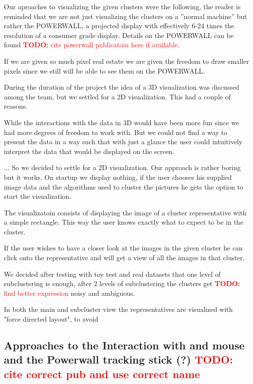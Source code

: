 \documentclass[journal]{vgtc}       %
\newcommand{\todo}[1]{\textcolor{red}{\textbf{TODO:} #1}}
\begin{document}
Our aproaches to visualizing the given clusters were the following, the reader is reminded that we are not just visualizing the clusters on a ''normal machine'' but rather the POWERWALL, a projected display with effectively 6-24 times the resolution of a consumer grade display. Details on the POWERWALL can be found \todo{cite powerwall publicatoin here if available}. \cite{powerwall}

If we are given so much pixel real estate we are given the freedom to draw smaller pixels since we still will be able to see them on the POWERWALL.

During the duration of the project the idea of a 3D visualization was discussed among the team, but we settled for a 2D visualization. This had a couple of reasons.

While the interactions with the data in 3D would have been more fun since we had more degrees of freedom to work with.
But we could not find a way to present the data in a way such that with just a glance the user could intuitively interpret the data that would be displayed on the screen.

... So we decided to settle for a 2D visualization. Our approach is rather boring but it works. On startup we display nothing, if the user chooses his supplied image data and the algorithms used to cluster the pictures he gets the option to start the visualization.

The visualizatoin consists of displaying the image of a cluster representative with a simple rectangle. 
This way the user knows exactly what to expect to be in the cluster.

If the user wishes to have a closer look at the images in the given cluster he can click onto the representative and will get a view of all the images in that cluster.

We decided after testing with toy test and real datasets that one level of subclustering is enough, after 2 levels of subclustering the clusters get \todo{find better expression}  noisy and ambiguous.

In both the main and subcluster view the representatives are visualized with "force directed layout", to avoid 

\subsection{Approaches to the Interaction with and mouse and the Powerwall tracking stick (?) \todo{cite correct pub and use correct name}}
\end{document}
